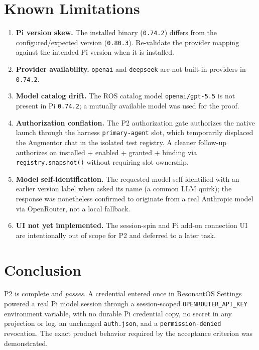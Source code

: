 \documentclass[11pt]{article}
\newcommand{\code}[1]{\texttt{#1}}
\begin{document}
\section{Known Limitations}

\begin{enumerate}
  \item \textbf{Pi version skew.} The installed binary (\code{0.74.2}) differs
    from the configured/expected version (\code{0.80.3}). Re-validate the
    provider mapping against the intended Pi version when it is installed.
  \item \textbf{Provider availability.} \code{openai} and \code{deepseek} are
    not built-in providers in \code{0.74.2}.
  \item \textbf{Model catalog drift.} The ROS catalog model
    \code{openai/gpt-5.5} is not present in Pi \code{0.74.2}; a mutually
    available model was used for the proof.
  \item \textbf{Authorization conflation.} The P2 authorization gate authorizes
    the native launch through the harness \code{primary-agent} slot, which
    temporarily displaced the Augmentor chat in the isolated test registry. A
    cleaner follow-up authorizes on installed + enabled + granted + binding via
    \code{registry.snapshot()} without requiring slot ownership.
  \item \textbf{Model self-identification.} The requested model self-identified
    with an earlier version label when asked its name (a common LLM quirk); the
    response was nonetheless confirmed to originate from a real Anthropic model
    via OpenRouter, not a local fallback.
  \item \textbf{UI not yet implemented.} The session-spin and Pi add-on
    connection UI are intentionally out of scope for P2 and deferred to a later
    task.
\end{enumerate}

\section{Conclusion}

P2 is complete and \emph{passes}. A credential entered once in ResonantOS
Settings powered a real Pi model session through a session-scoped
\code{OPENROUTER\_API\_KEY} environment variable, with no durable Pi credential
copy, no secret in any projection or log, an unchanged \code{auth.json}, and a
\code{permission-denied} revocation. The exact product behavior required by the
acceptance criterion was demonstrated.
\end{document}
